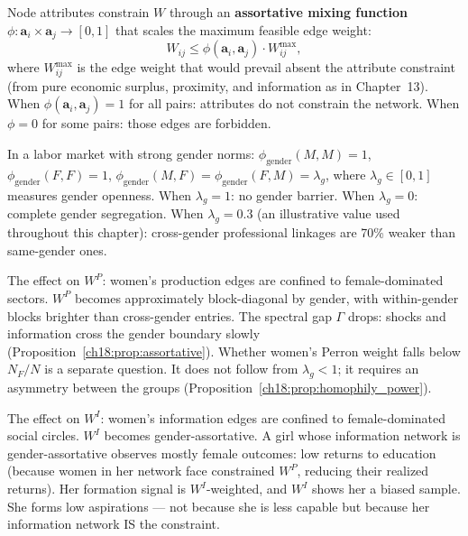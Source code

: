 \documentclass[../structural_economics_book.tex]{subfiles}
\begin{document}
\begin{definition}\label{ch18:def:constrained_W}
Node attributes constrain $W$ through an \textbf{assortative mixing function} $\phi: \mathbf{a}_i \times \mathbf{a}_j \to [0, 1]$ that scales the maximum feasible edge weight:
\begin{equation}\label{ch18:eq:constrained}
W_{ij} \leq \phi(\mathbf{a}_i, \mathbf{a}_j) \cdot W^{\max}_{ij},
\end{equation}
where $W^{\max}_{ij}$ is the edge weight that would prevail absent the attribute constraint (from pure economic surplus, proximity, and information as in Chapter~13). When $\phi(\mathbf{a}_i, \mathbf{a}_j) = 1$ for all pairs: attributes do not constrain the network. When $\phi = 0$ for some pairs: those edges are forbidden.
\end{definition}

\begin{example}\label{ch18:ex:gender}
In a labor market with strong gender norms: $\phi_{\text{gender}}(M, M) = 1$, $\phi_{\text{gender}}(F, F) = 1$, $\phi_{\text{gender}}(M, F) = \phi_{\text{gender}}(F, M) = \lambda_g$, where $\lambda_g \in [0, 1]$ measures gender openness. When $\lambda_g = 1$: no gender barrier. When $\lambda_g = 0$: complete gender segregation. When $\lambda_g = 0.3$ (an illustrative value used throughout this chapter): cross-gender professional linkages are 70\% weaker than same-gender ones.

The effect on $W^P$: women's production edges are confined to female-dominated sectors. $W^P$ becomes approximately block-diagonal by gender, with within-gender blocks brighter than cross-gender entries. The spectral gap $\Gamma$ drops: shocks and information cross the gender boundary slowly (Proposition~\ref{ch18:prop:assortative}). Whether women's Perron weight falls below $N_F/N$ is a separate question. It does not follow from $\lambda_g < 1$; it requires an asymmetry between the groups (Proposition~\ref{ch18:prop:homophily_power}).

The effect on $W^I$: women's information edges are confined to female-dominated social circles. $W^I$ becomes gender-assortative. A girl whose information network is gender-assortative observes mostly female outcomes: low returns to education (because women in her network face constrained $W^P$, reducing their realized returns). Her formation signal is $W^I$-weighted, and $W^I$ shows her a biased sample. She forms low aspirations --- not because she is less capable but because her information network IS the constraint.
\end{example}
\end{document}
